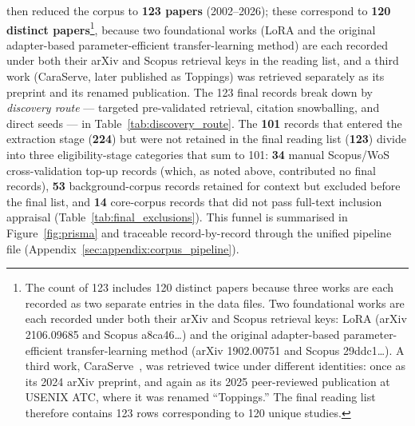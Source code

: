 then reduced the corpus to \textbf{123 papers} (2002--2026); these correspond
to \textbf{120 distinct papers}\footnote{The count of 123 includes 120 distinct
papers because three works are each recorded as two separate entries in the
data files. Two foundational works are each recorded under both their arXiv
and Scopus retrieval keys: LoRA (arXiv 2106.09685 and Scopus a8ca46\ldots) and
the original adapter-based parameter-efficient transfer-learning method (arXiv
1902.00751 and Scopus 29ddc1\ldots). A third work, CaraServe~\cite{Li2024CaraServe},
was retrieved twice under different identities: once as its 2024 arXiv
preprint, and again as its 2025 peer-reviewed publication at USENIX ATC, where
it was renamed ``Toppings.'' The final reading list therefore contains
123 rows corresponding to 120 unique studies.}, because two foundational works
(LoRA and the original adapter-based parameter-efficient transfer-learning
method) are each recorded under both their arXiv and Scopus retrieval keys in
the reading list, and a third work (CaraServe, later published as Toppings)
was retrieved separately as its preprint and its renamed publication.
The 123 final records break down by \emph{discovery route} --- targeted
pre-validated retrieval, citation snowballing, and direct seeds --- in
Table~\ref{tab:discovery_route}. The \textbf{101} records that entered the
extraction stage (\textbf{224}) but were not retained in the final reading list
(\textbf{123}) divide into three eligibility-stage categories that sum to 101:
\textbf{34} manual Scopus/WoS cross-validation top-up records (which, as noted
above, contributed no final records), \textbf{53} background-corpus records
retained for context but excluded before the final list, and \textbf{14}
core-corpus records that did not pass full-text inclusion appraisal
(Table~\ref{tab:final_exclusions}). This funnel is summarised in
Figure~\ref{fig:prisma} and traceable record-by-record through the unified
pipeline file (Appendix~\ref{sec:appendix:corpus_pipeline}).

